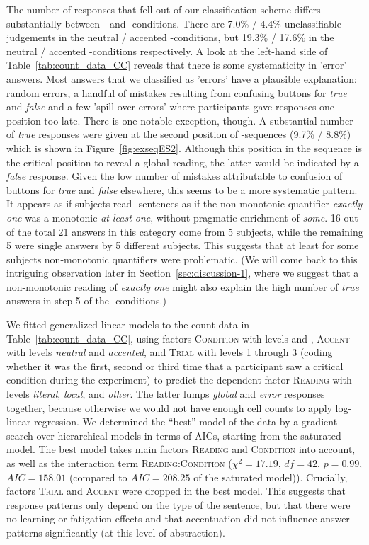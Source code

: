 \documentclass[fleqn,reqno,10pt]{article}
\newcommand{\as}{\acro{as}}
\renewcommand{\es}{\acro{es}}
\begin{document}
The number of responses that fell out of our classification scheme
differs substantially between \as- and \es-conditions. There are 7.0\%
/ 4.4\% unclassifiable judgements in the neutral / accented
\as-conditions, but 19.3\% / 17.6\% in the neutral / accented
\es-conditions respectively. A look at the left-hand side of
Table~\ref{tab:count_data_CC} reveals that there is some systematicity
in 'error' answers. Most answers that we classified as 'errors' have a
plausible explanation: random errors, a handful of mistakes resulting
from confusing buttons for \emph{true} and \emph{false} and a few
'spill-over errors' where participants gave responses one position too
late. There is one notable exception, though. A substantial number of
\emph{true} responses were given at the second position of
\es-sequences (9.7\% / 8.8\%) which is shown in
Figure~\ref{fig:exseqES2}. Although this position in the sequence is
the critical position to reveal a global reading, the latter would be
indicated by a \emph{false} response. Given the low number of mistakes
attributable to confusion of buttons for \emph{true} and \emph{false}
elsewhere, this seems to be a more systematic pattern. It appears as
if subjects read \es-sentences as if the non-monotonic quantifier
\emph{exactly one} was a monotonic \emph{at least one}, without
pragmatic enrichment of \emph{some}. 16 out of the total 21 answers in
this category come from 5 subjects, while the remaining 5 were single
answers by 5 different subjects.
This suggests that at least for some subjects non-monotonic
quantifiers were problematic. (We will come back to this intriguing
observation later in Section~\ref{sec:discussion-1}, where we suggest
that a non-monotonic reading of \emph{exactly one} might also explain
the high number of \emph{true} answers in step 5 of the
\es-conditions.)

We fitted generalized linear models to the count data in
Table~\ref{tab:count_data_CC}, using factors \textsc{Condition} with
levels \as and \es, \textsc{Accent} with levels \emph{neutral} and
\emph{accented}, and \textsc{Trial} with levels 1 through 3 (coding
whether it was the first, second or third time that a participant saw
a critical condition during the experiment) to predict the dependent
factor \textsc{Reading} with levels \emph{literal}, \emph{local}, and
\emph{other}. The latter lumps \emph{global} and \emph{error}
responses together, because otherwise we would not have enough cell
counts to apply log-linear regression. We determined the ``best''
model of the data by a gradient search over hierarchical models in
terms of AICs, starting from the saturated model. The best model takes
main factors \textsc{Reading} and \textsc{Condition} into account, as
well as the interaction term \textsc{Reading:Condition} ($\chi^2 =
17.19$, $df=42$, $p = 0.99$, $AIC = 158.01$ (compared to $AIC=208.25$
of the saturated model)). Crucially, factors \textsc{Trial} and
\textsc{Accent} were dropped in the best model. This suggests that
response patterns only depend on the type of the sentence, but that
there were no learning or fatigation effects and that accentuation did
not influence answer patterns significantly (at this level of
abstraction).
\end{document}

